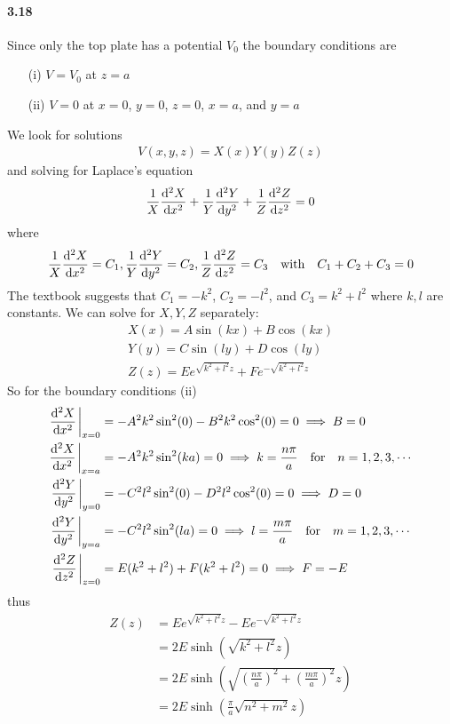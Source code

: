 \documentclass[../main.tex]{subfiles}
\begin{document}
\paragraph{3.18} Since only the top plate has a potential $V_0$ the boundary conditions are
\begin{enumerate}
    \item [(i)] $V = V_0$ at $z = a$
    \item [(ii)] $V = 0$ at $x = 0$, $y = 0$, $z = 0$, $x = a$, and $y = a$
\end{enumerate}
We look for solutions
\begin{align*}
    V(x,y,z) = X(x)Y(y)Z(z)
\end{align*}
and solving for Laplace's equation
\begin{align*}
    \frac{1}{X} \dv[2]{X}{x} + \frac{1}{Y} \dv[2]{Y}{y} + \frac{1}{Z} \dv[2]{Z}{z} = 0
\end{align*}
where
\begin{align*}
    \frac{1}{X} \dv[2]{X}{x} = C_1, \frac{1}{Y} \dv[2]{Y}{y} = C_2, \frac{1}{Z} \dv[2]{Z}{z} = C_3 \qqtext{with} C_1 + C_2 + C_3 = 0
\end{align*}
The textbook suggests that $C_1 = -k^2$, $C_2 = -l^2$, and $C_3 = k^2 + l^2$ where $k,l$ are constants. We can solve for $X,Y,Z$ separately:
\begin{align*}
    X(x) = A \sin(kx) + B \cos(kx) \\
    Y(y) = C \sin(ly) + D \cos(ly) \\
    Z(z) = E e^{\sqrt{k^2 + l^2} z} + F e^{-\sqrt{k^2 + l^2} z}
\end{align*}
So for the boundary conditions (ii) 
\begin{align*}
    \dv[2]{X}{x}\eval_{x = 0} &= - A^2 k^2 \sin^2(0) - B^2 k^2 \cos^2(0) = 0 \implies B = 0 \\
    \dv[2]{X}{x}\eval_{x = a} &= - A^2 k^2 \sin^2(ka) = 0 \implies k = \frac{n\pi}{a} \qq{for} n = 1,2,3,\cdots \\
    \dv[2]{Y}{y}\eval_{y = 0} &= - C^2 l^2 \sin^2(0) - D^2 l^2 \cos^2(0) = 0 \implies D = 0 \\
    \dv[2]{Y}{y}\eval_{y = a} &= - C^2 l^2 \sin^2(la) = 0 \implies l = \frac{m\pi}{a} \qq{for} m = 1,2,3,\cdots \\
    \dv[2]{Z}{z}\eval_{z = 0} &= E (k^2 + l^2) + F(k^2 + l^2)  = 0 \implies F = -E
\end{align*}
thus
\begin{align*}
    Z(z) &= E e^{\sqrt{k^2 + l^2} z} - E e^{-\sqrt{k^2 + l^2} z} \\
    &= 2E \sinh(\sqrt{k^2 + l^2} z) \\
    &= 2E \sinh(\sqrt{(\frac{n\pi}{a})^2 + (\frac{m\pi}{a})^2} z) \\
    &= 2E \sinh(\frac{\pi}{a} \sqrt{n^2 + m^2} z)
\end{align*}
\end{document}
